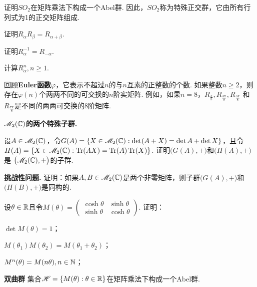 \begin{mybox}
\begin{problem}
\begin{enum}
    证明$SO_2$在矩阵乘法下构成一个Abel群. 因此，$SO_2$称为{\kaishu 特殊正交群}，它由所有行列式为1的正交矩阵组成.
    \item \label{prob1.61.c} 证明$R_\alpha R_\beta=R_{\alpha+\beta}$.
    \item \label{prob1.61.d} 证明$R_\alpha^{-1}=R_{-\alpha}$.
    \item 计算$R_\alpha^n,n\ge1$.
  \end{enum}
  \begin{nota}
    回顾{\bfseries Euler函数}$\varphi$，它表示不超过$n$的与$n$互素的正整数的个数. 如果整数$n\ge2$，则存在$\varphi(n)$个两两不同的可交换的$n$阶实矩阵. 例如，如果$n=8$，$R_{\frac\pi8},R_{\frac{3\pi}8},R_{\frac{5\pi}8}$
    和$R_{\frac{7\pi}8}$是不同的两两可交换的8阶矩阵.
  \end{nota}
\end{problem}
\end{mybox}

\begin{mybox}
  \begin{problem}
  {\bfseries $\mathscr M_2(\mathbb C)$的两个特殊子群.}

  设$A\in\mathscr M_2(\mathbb C)$，令$G(A)=\{
    X\in\mathscr M_2(\mathbb C):\det(A+X)=\det A+\det X
  \}$，且令$H(A)=\{X\in\mathscr M_2(\mathbb C):\operatorname{Tr}(AX)=\operatorname{Tr}(A)\operatorname{Tr}(X)\}$. 证明$\big(G(A),+\big)$和$\big(H(A),+\big)$是
  $\big(\mathscr M_2(\mathbb C),+\big)$的子群.

  {\bfseries 挑战性问题.} 证明：如果$A,B\in\mathscr M_2(\mathbb C)$是两个非零矩阵，则子群$\big(G(A),+\big)$和$\big(H(B),+\big)$是同构的.
  \end{problem}
\end{mybox}

\begin{problem}
  设$\theta\in\mathbb R$且令$M(\theta)=\begin{pmatrix}
    \cosh\theta & \sinh\theta\\
    \sinh\theta & \cosh\theta
  \end{pmatrix}$. 证明：
  \begin{enum}
    \item $\det M(\theta)=1$；
    \item \label{prob1.63.b} $M(\theta_1)M(\theta_2)=M(\theta_1+\theta_2)$；
    \item $M^n(\theta)=M(n\theta),n\in\mathbb N$；
    \item {\bfseries 双曲群} 集合$\mathscr H=\{M(\theta):\theta\in\mathbb R\}$在矩阵乘法下构成一个Abel群.
  \end{enum}
\end{problem}

